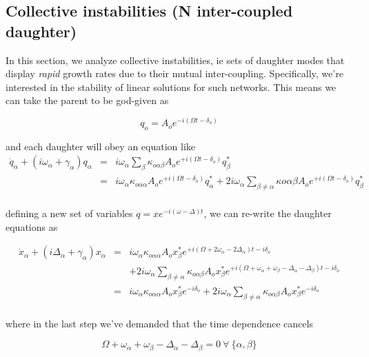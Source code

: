 \subsection*{Collective instabilities (N inter-coupled daughter)}

In this section, we analyze collective instabilities, ie sets of daughter modes that display \emph{rapid} growth rates due to their mutual inter-coupling. Specifically, we're interested in the stability of linear solutions for such networks. This means we can take the parent to be god-given as

\begin{equation}
q_o = A_o e^{-i(\Omega t -\delta_o)}
\end{equation}

and each daughter will obey an equation like
\begin{eqnarray}
\dot{q}_\alpha + (i\omega_\alpha+\gamma_\alpha)q_\alpha & = & i\omega_\alpha \sum_{\beta} \kappa_{o\alpha\beta} A_o e^{+i(\Omega t -\delta_o)} q_\beta^\ast \\
& = & i\omega_\alpha\kappa_{o\alpha\alpha}A_o e^{+i(\Omega t -\delta_o)} q_\alpha^\ast + 2i\omega_\alpha\sum_{\beta\neq\alpha}\kappa{o\alpha\beta}A_o e^{+i(\Omega t -\delta_o)} q_\beta^\ast \\
\end{eqnarray}

defining a new set of variables $q = xe^{-i(\omega -\Delta)t}$, we can re-write the daughter equations as

\begin{eqnarray}
\dot{x}_\alpha + (i\Delta_\alpha+\gamma_\alpha)x_\alpha & = & i\omega_\alpha\kappa_{o\alpha\alpha}A_o x_\beta^\ast e^{+i(\Omega +2\omega_\alpha-2\Delta_\alpha)t-i\delta_o} \\
& &  + 2i\omega_\alpha\sum_{\beta\neq\alpha}\kappa_{o\alpha\beta}A_o x_\beta^\ast e^{+i(\Omega +\omega_\alpha+\omega_\beta -\Delta_\alpha-\Delta_\beta)t -i\delta_o} \\
& = & i\omega_\alpha\kappa_{o\alpha\alpha}A_o x_\beta^\ast e^{-i\delta_o} + 2i\omega_\alpha\sum_{\beta\neq\alpha}\kappa_{o\alpha\beta}A_o x_\beta^\ast e^{-i\delta_o} \\
\end{eqnarray}

where in the last step we've demanded that the time dependence cancels

\begin{equation}
\Omega +\omega_\alpha+\omega_\beta -\Delta_\alpha-\Delta_\beta = 0\ \forall\ \{\alpha,\beta\}
\end{equation}

